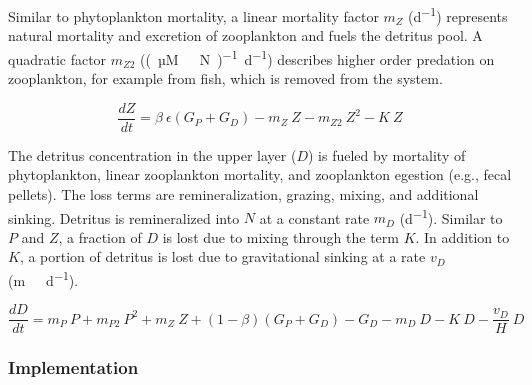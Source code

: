 \documentclass[gmd, manuscript]{copernicus}
\begin{document}
Similar to phytoplankton mortality, a linear mortality factor $m_Z$ (\unit{d^{-1}}) represents natural mortality and excretion of zooplankton and fuels the detritus pool. A quadratic factor $m_{Z2}$ (\unit{(µM \ N)^{-1} d^{−1}}) describes higher order predation on zooplankton, for example from fish, which is removed from the system. 

\begin{equation}
    \label{Eq:EmpowerZoo}
    \frac{d Z}{d t} =
    \beta \ \epsilon(G_P + G_D) %
    - m_Z \ Z %
    - m_{Z2} \ Z^2 %
    - K \ Z %
\end{equation}


The detritus concentration in the upper layer ($D$) is fueled by mortality of phytoplankton, linear zooplankton mortality, and zooplankton egestion (e.g., fecal pellets). The loss terms are remineralization, grazing, mixing, and additional sinking. Detritus is remineralized into $N$ at a constant rate $m_D$ (\unit{d^{−1}}). Similar to $P$ and $Z$, a fraction of $D$ is lost due to mixing through the term $K$. In addition to $K$, a portion of detritus is lost due to gravitational sinking at a rate $v_D$ (\unit{m\ d^{−1}}). 

\begin{equation}
    \label{Eq:EmpowerDet}
    \frac{d D}{d t} = 
    m_P \ P %
    + m_{P2} \ P^2 %
    + m_Z \ Z %
    + (1 - \beta)(G_P + G_D) %
    - G_D %
    - m_D \ D %
    - K \ D %
    - \frac{v_D}{H} \ D %
\end{equation}






\subsubsection{Implementation}
\label{Section:EMPOWERImplementation}
\end{document}
